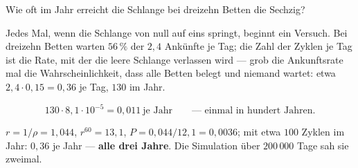 \begin{aufgabe}
Wie oft im Jahr erreicht die Schlange bei dreizehn Betten die Sechzig?

\loesung
{}
Jedes Mal, wenn die Schlange von null auf eins springt, beginnt ein Versuch. Bei dreizehn Betten warten $56\,\%$ der $2{,}4$ Ankünfte je Tag; die Zahl der Zyklen je Tag ist die Rate, mit der die leere Schlange verlassen wird --- grob die Ankunftsrate mal die Wahrscheinlichkeit, dass alle Betten belegt und niemand wartet: etwa $2{,}4\cdot0{,}15 = 0{,}36$ je Tag, $130$ im Jahr.

\[ 130\cdot8{,}1\cdot10^{-5} = 0{,}011 \ \text{je Jahr} \qquad\text{--- einmal in hundert Jahren.} \]

$r = 1/\rho = 1{,}044$, $r^{60} = 13{,}1$, $P = 0{,}044/12{,}1 = 0{,}0036$; mit etwa $100$ Zyklen im Jahr: $0{,}36$ je Jahr --- \textbf{alle drei Jahre}. Die Simulation über $200\,000$ Tage sah sie zweimal.

\begin{center}
\begin{minipage}{0.88\textwidth}
\end{minipage}
\end{center}
\end{aufgabe}

